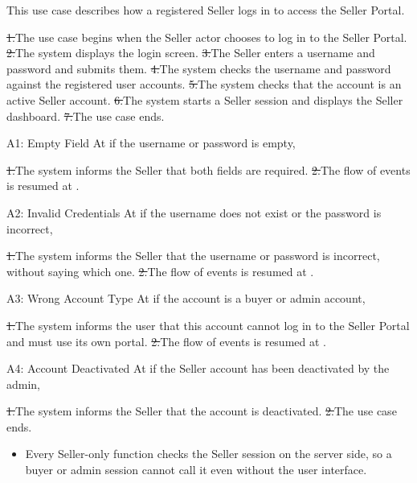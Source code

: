 This use case describes how a registered Seller logs in to access the Seller Portal.\par
{}
\st{1.}{The use case begins when the Seller actor chooses to log in to the Seller Portal.}
\st{2.}{The system displays the login screen.}
\st{3.}{The Seller enters a username and password and submits them.}
\st{4.}{The system checks the username and password against the registered user accounts.}
\st{5.}{The system checks that the account is an active Seller account.}
\st{6.}{The system starts a Seller session and displays the Seller dashboard.}
\st{7.}{The use case ends.}
\begin{flowblock}{A1: Empty Field}
At  if the username or password is empty,\par
\st{1.}{The system informs the Seller that both fields are required.}
\st{2.}{The flow of events is resumed at .}
\end{flowblock}
\begin{flowblock}{A2: Invalid Credentials}
At  if the username does not exist or the password is incorrect,\par
\st{1.}{The system informs the Seller that the username or password is incorrect, without saying which one.}
\st{2.}{The flow of events is resumed at .}
\end{flowblock}
\begin{flowblock}{A3: Wrong Account Type}
At  if the account is a buyer or admin account,\par
\st{1.}{The system informs the user that this account cannot log in to the Seller Portal and must use its own portal.}
\st{2.}{The flow of events is resumed at .}
\end{flowblock}
\begin{flowblock}{A4: Account Deactivated}
At  if the Seller account has been deactivated by the admin,\par
\st{1.}{The system informs the Seller that the account is deactivated.}
\st{2.}{The use case ends.}
\end{flowblock}
\begin{itemize}
  \item Every Seller-only function checks the Seller session on the server side, so a buyer or admin session cannot call it even without the user interface.
\end{itemize}

